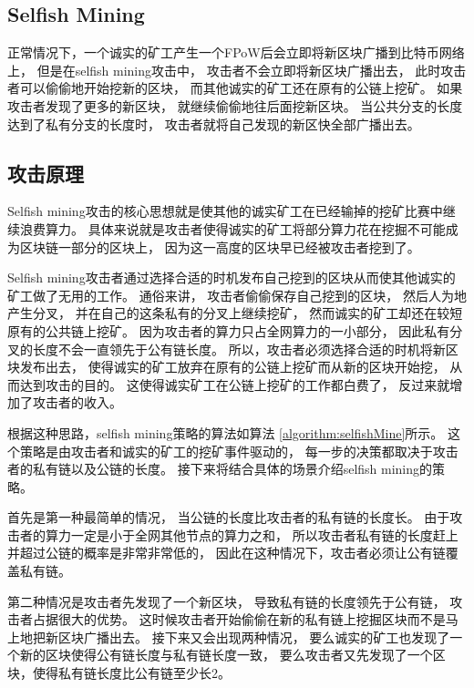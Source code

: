 \documentclass[a4paper, 11pt]{article}
\begin{document}
\begin{CJK*}{UTF8}{gbsn}
    \section{Selfish Mining}

    \indent

    正常情况下，一个诚实的矿工产生一个FPoW后会立即将新区块广播到比特币网络上，
    但是在selfish mining攻击\cite{ref_selfish_mining1}中，
    攻击者不会立即将新区块广播出去，
    此时攻击者可以偷偷地开始挖新的区块，
    而其他诚实的矿工还在原有的公链上挖矿。
    如果攻击者发现了更多的新区块，
    就继续偷偷地往后面挖新区块。
    当公共分支的长度达到了私有分支的长度时，
    攻击者就将自己发现的新区快全部广播出去。

    \subsection{攻击原理}

    \indent

    Selfish mining攻击的核心思想就是使其他的诚实矿工在已经输掉的挖矿比赛中继续浪费算力。
    具体来说就是攻击者使得诚实的矿工将部分算力花在挖掘不可能成为区块链一部分的区块上，
    因为这一高度的区块早已经被攻击者挖到了。

    Selfish mining攻击者通过选择合适的时机发布自己挖到的区块从而使其他诚实的矿工做了无用的工作。
    通俗来讲，
    攻击者偷偷保存自己挖到的区块，
    然后人为地产生分叉，
    并在自己的这条私有的分叉上继续挖矿，
    然而诚实的矿工却还在较短原有的公共链上挖矿。
    因为攻击者的算力只占全网算力的一小部分，
    因此私有分叉的长度不会一直领先于公有链长度。
    所以，攻击者必须选择合适的时机将新区块发布出去，
    使得诚实的矿工放弃在原有的公链上挖矿而从新的区块开始挖，
    从而达到攻击的目的。
    这使得诚实矿工在公链上挖矿的工作都白费了，
    反过来就增加了攻击者的收入。

    根据这种思路，selfish mining策略的算法如算法 \ref{algorithm:selfishMine}所示。
    这个策略是由攻击者和诚实的矿工的挖矿事件驱动的，
    每一步的决策都取决于攻击者的私有链以及公链的长度。
    接下来将结合具体的场景介绍selfish mining的策略。

    首先是第一种最简单的情况，
    当公链的长度比攻击者的私有链的长度长。
    由于攻击者的算力一定是小于全网其他节点的算力之和，
    所以攻击者私有链的长度赶上并超过公链的概率是非常非常低的，
    因此在这种情况下，攻击者必须让公有链覆盖私有链。

    第二种情况是攻击者先发现了一个新区块，
    导致私有链的长度领先于公有链，
    攻击者占据很大的优势。
    这时候攻击者开始偷偷在新的私有链上挖掘区块而不是马上地把新区块广播出去。
    接下来又会出现两种情况，
    要么诚实的矿工也发现了一个新的区块使得公有链长度与私有链长度一致，
    要么攻击者又先发现了一个区块，使得私有链长度比公有链至少长2。


\end{CJK*}
\end{document}
